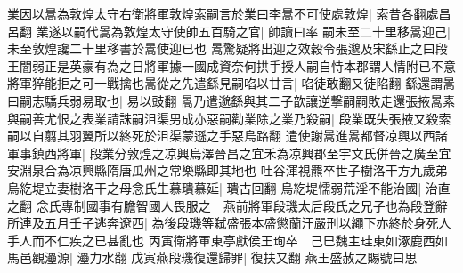 業因以暠為敦煌太守右衛將軍敦煌索嗣言於業曰李暠不可使處敦煌|{
	索昔各翻處昌呂翻}
業遂以嗣代暠為敦煌太守使帥五百騎之官|{
	帥讀曰率}
嗣未至二十里移暠迎己|{
	未至敦煌讒二十里移書於暠使迎已也}
暠驚疑將出迎之效穀令張邈及宋繇止之曰段王闇弱正是英豪有為之日將軍據一國成資奈何拱手授人嗣自恃本郡謂人情附已不意將軍猝能拒之可一戰擒也暠從之先遣繇見嗣啗以甘言|{
	啗徒敢翻又徒陷翻}
繇還謂暠曰嗣志驕兵弱易取也|{
	易以豉翻}
暠乃遣邈繇與其二子歆讓逆撃嗣嗣敗走還張掖暠素與嗣善尤恨之表業請誅嗣沮渠男成亦惡嗣勸業除之業乃殺嗣|{
	段業既失張掖又殺索嗣以自翦其羽翼所以終死於沮渠蒙遜之手惡烏路翻}
遣使謝暠進暠都督凉興以西諸軍事鎮西將軍|{
	段業分敦煌之凉興烏澤晉昌之宜禾為凉興郡至宇文氏併晉之廣至宜安淵泉合為凉興縣隋唐瓜州之常樂縣即其地也}
吐谷渾視羆卒世子樹洛干方九歲弟烏紇堤立妻樹洛干之母念氏生慕璝慕延|{
	璝古回翻}
烏紇堤懦弱荒淫不能治國|{
	治直之翻}
念氏專制國事有膽智國人畏服之　燕前將軍段璣太后段氏之兄子也為段登辭所連及五月壬子逃奔遼西|{
	為後段璣等弑盛張本盛懲蘭汗嚴刑以繩下亦終於身死人手人而不仁疾之已甚亂也}
丙寅衛將軍東亭獻侯王珣卒　己巳魏主珪東如涿鹿西如馬邑觀灅源|{
	灅力水翻}
戊寅燕段璣復還歸罪|{
	復扶又翻}
燕王盛赦之賜號曰思

